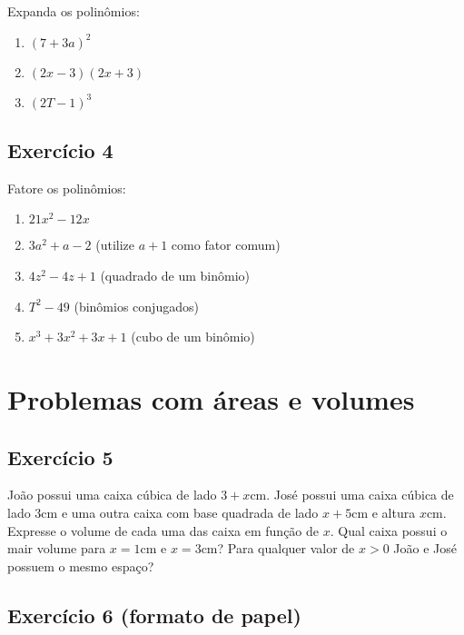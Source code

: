 Expanda os polinômios:

\begin{enumerate}
\item $(7+3a)^2$
\item $(2x-3)(2x+3)$
\item $(2T-1)^3$
\end{enumerate}

\subsection*{Exercício 4}

Fatore os polinômios:

\begin{enumerate}
\item $21x^2 - 12x$
\item $3a^2 + a-2$ (utilize $a+1$ como fator comum)
\item $4z^2 - 4z + 1$ (quadrado de um binômio)
\item $T^2 - 49$ (binômios conjugados)
\item $x^3 + 3x^2 + 3x + 1$ (cubo de um binômio)
\end{enumerate}

\section{Problemas com áreas e volumes}

\subsection*{Exercício 5}

João possui uma caixa cúbica de lado $3+x$cm. José possui uma caixa cúbica de
lado $3$cm e uma outra caixa com base quadrada de lado $x+5$cm e altura $x$cm.
Expresse o volume de cada uma das caixa em função de $x$. Qual caixa possui o
mair volume para $x=1$cm e $x = 3$cm? Para qualquer valor de $x > 0$ João e José
possuem o mesmo espaço?

\subsection*{Exercício 6 (formato de papel)}

\begin{center}
\end{center}

